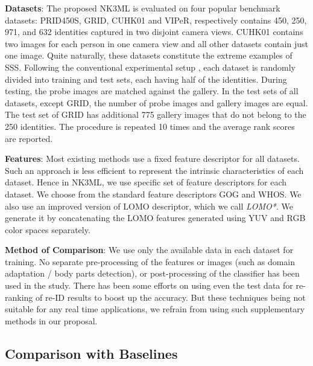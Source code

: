 \documentclass[runningheads]{llncs}
\begin{document}
\setlength{\parskip}{1mm}
\noindent\textbf{Datasets}: The proposed NK3ML is evaluated on four popular benchmark datasets: PRID450S\cite{PRID450S}, GRID\cite{GRID1}, CUHK01\cite{CUHK01} and VIPeR\cite{ELF}, respectively contains 450, 250, 971, and 632 identities captured in two disjoint camera views.
CUHK01 contains two images for each person in one camera view and all other datasets contain just one image. Quite naturally, these datasets constitute the extreme examples of SSS. Following the conventional experimental setup \cite{song:scalableManifold,GOG,SCSP,LOMO,metric_ensembles,colornames}, each dataset is randomly divided into training and test sets, each having half of the identities. During testing, the probe images are matched against the gallery. In the test sets of all datasets, except GRID, the number of probe images and gallery images are equal. The test set of GRID has additional 775 gallery images that do not belong to the 250 identities. The procedure is repeated 10 times and the average rank scores are reported.

\noindent\textbf{Features}: Most existing methods use a fixed feature descriptor for all datasets.
Such an approach is less efficient to represent the intrinsic characteristics of each dataset. Hence in NK3ML, we use specific set of feature descriptors for each dataset.
We choose from the standard feature descriptors GOG\cite{GOG} and WHOS\cite{LisantiPAMI14}. We also use an improved version of LOMO\cite{LOMO} descriptor, which we call \textit{LOMO*}.
We generate it by concatenating the LOMO features generated using YUV and RGB color spaces separately.

\noindent\textbf{Method of Comparison}: We use only the available data in each dataset for training. No separate pre-processing of the features or images (such as domain adaptation / body parts detection), or post-processing of the classifier has been used in the study. There has been some efforts on
using even the test data for re-ranking of re-ID results \cite{song:scalableManifold,Reranking:kreciprocal,SHaPE} to boost up the accuracy. But these techniques being not suitable for any real time applications, we refrain from using such supplementary methods in our proposal.
\setlength{\parskip}{0mm}

\subsection{Comparison with Baselines}
\label{ssec:Baselines}
\end{document}
